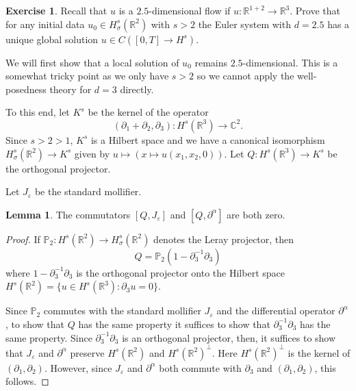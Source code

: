 \documentclass[10pt]{article}
\newcommand{\RR}{\mathbb{R}}
\newcommand{\CC}{\mathbb{C}}
\newcommand{\PP}{\mathbb P}
\theoremstyle{definition}
\newtheorem{exer}{Exercise}
\newtheorem{lemma}{Lemma}[exer]
\begin{document}
\begin{exer}
Recall that $u$ is a $2.5$-dimensional flow if $u: \RR^{1+2} \to \RR^3$.
Prove that for any initial data $u_0 \in H^s_\sigma(\RR^2)$ with $s > 2$ the Euler system with $d = 2.5$ has a unique global solution $u \in C([0, T] \to H^s)$.
\end{exer}

We will first show that a local solution of $u_0$ remains $2.5$-dimensional.
This is a somewhat tricky point as we only have $s > 2$ so we cannot apply the well-posedness theory for $d = 3$ directly.

To this end, let $K^s$ be the kernel of the operator
$$(\partial_1 + \partial_2, \partial_3): H^s(\RR^3) \to \CC^2.$$
Since $s > 2 > 1$, $K^s$ is a Hilbert space and we have a canonical isomorphism $H^s_\sigma(\RR^2) \to K^s$ given by $u \mapsto (x \mapsto u(x_1, x_2, 0))$.
Let $Q: H^s(\RR^3) \to K^s$ be the orthogonal projector.

Let $J_\varepsilon$ be the standard mollifier.
\begin{lemma}
\label{commutation}
The commutators $[Q, J_\varepsilon]$ and $[Q, \partial^\alpha]$ are both zero.
\end{lemma}
\begin{proof}
If $\PP_2: H^s(\RR^2) \to H^s_\sigma(\RR^2)$ denotes the Leray projector, then
$$Q = \PP_2(1 - \partial_3^{-1}\partial_3)$$
where $1 - \partial_3^{-1}\partial_3$ is the orthogonal projector onto the Hilbert space $H^s(\RR^2) = \{u \in H^s(\RR^3): \partial_3 u = 0\}$.

Since $\PP_2$ commutes with the standard mollifier $J_\varepsilon$ and the differential operator $\partial^\alpha$, to show that $Q$ has the same property it suffices to show that $\partial_3^{-1}\partial_3$ has the same property.
Since $\partial_3^{-1}\partial_3$ is an orthogonal projector, then, it suffices to show that $J_\varepsilon$ and $\partial^\alpha$ preserve $H^s(\RR^2)$ and $H^s(\RR^2)^\perp$.
Here $H^s(\RR^2)^\perp$ is the kernel of $(\partial_1, \partial_2)$.
However, since $J_\varepsilon$ and $\partial^\alpha$ both commute with $\partial_3$ and $(\partial_1, \partial_2)$, this follows.
\end{proof}
\end{document}
